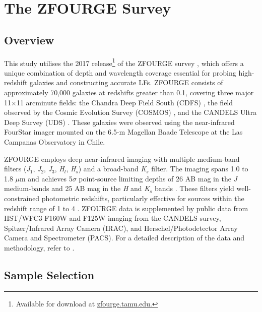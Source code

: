\section{The ZFOURGE Survey} \label{Sec: The ZFOURGE Survey}
\subsection{Overview}

This study utilises the 2017 release\footnote{Available for download at \href{https://zfourge.tamu.edu/}{zfourge.tamu.edu.}} of the ZFOURGE survey \citep{straatman_fourstar_2016}, which offers a unique combination of depth and wavelength coverage essential for probing high-redshift galaxies and constructing accurate LFs. ZFOURGE consists of approximately 70,000 galaxies at redshifts greater than 0.1, covering three major 11$\times$11 arcminute fields: the Chandra Deep Field South (CDFS) \citep{giacconi_chandra_2002}, the field observed by the Cosmic Evolution Survey (COSMOS) \citep{scoville_cosmic_2007}, and the CANDELS Ultra Deep Survey (UDS) \citep{lawrence_ukirt_2007}. These galaxies were observed using the near-infrared FourStar imager \citep{persson_fourstar_2013} mounted on the 6.5-m Magellan Baade Telescope at the Las Campanas Observatory in Chile. 

ZFOURGE employs deep near-infrared imaging with multiple medium-band filters (\textit{J}$_{1}$, \textit{J}$_2$, \textit{J}$_{3}$, \textit{H}$_{l}$, \textit{H}$_{s}$) and a broad-band \textit{K}$_{s}$ filter. The imaging spans 1.0 to 1.8 $\mu$m and achieves 5$\sigma$ point-source limiting depths of 26 AB mag in the \textit{J} medium-bands and 25 AB mag in the \textit{H} and \textit{K}$_{s}$ bands \citep{spitler_first_2012}. These filters yield well-constrained photometric redshifts, particularly effective for sources within the redshift range of 1 to 4 \citep{spitler_first_2012}. ZFOURGE data is supplemented by public data from HST/WFC3 F160W and F125W imaging from the CANDELS survey, Spitzer/Infrared Array Camera (IRAC), and Herschel/Photodetector Array Camera and Spectrometer (PACS). For a detailed description of the data and methodology, refer to \cite{straatman_fourstar_2016}.

\subsection{Sample Selection} \label{Sec: Sample Selection}
